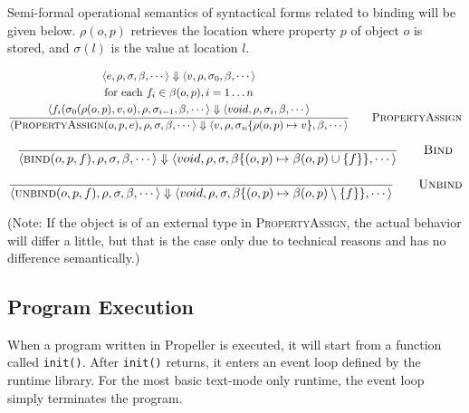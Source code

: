 Semi-formal operational semantics of syntactical forms related to binding will be given below.
$\rho(o, p)$ retrieves the location where property $p$ of object $o$ is stored, and $\sigma(l)$ is
the value at location $l$.

$$
\dfrac{\begin{gathered}
\langle e,\rho,\sigma,\beta,\cdots \rangle \Downarrow
\langle v,\rho,\sigma_0,\beta,\cdots \rangle\\
\textrm{for each } f_i\in\beta(o, p), i=1\dots n\\
\langle f_i(\sigma_0(\rho(o,p),v,o),\rho,\sigma_{i-1},\beta,\cdots \rangle \Downarrow
\langle void,\rho,\sigma_i,\beta,\cdots \rangle
\end{gathered}
}
{\langle \textsc{PropertyAssign}(o,p,e),\rho,\sigma,\beta,\cdots \rangle
\Downarrow
\langle v,\rho,\sigma_n\{\rho(o,p)\mapsto v\},\beta,\cdots \rangle
} \qquad \textsc{PropertyAssign}
$$

$$
\dfrac{}
{\langle \textsc{bind}(o,p,f),\rho,\sigma,\beta,\cdots \rangle
\Downarrow
\langle void,\rho,\sigma,\beta\{(o,p)\mapsto \beta(o,p)\cup \{f\}\},\cdots \rangle
} \qquad \textsc{Bind}
$$

$$
\dfrac{}
{\langle \textsc{unbind}(o,p,f),\rho,\sigma,\beta,\cdots \rangle
\Downarrow
\langle void,\rho,\sigma,\beta\{(o,p)\mapsto \beta(o,p)\setminus \{f\}\},\cdots \rangle
} \qquad \textsc{Unbind}
$$

(Note: If the object is of an external type in \textsc{PropertyAssign}, the actual behavior will
differ a little, but that is the case only due to technical reasons and has no difference
semantically.)

\subsection{Program Execution}

When a program written in Propeller is executed, it will start from a function called \verb|init()|.
After \verb|init()| returns, it enters an event loop defined by the runtime library. For the
most basic text-mode only runtime, the event loop simply terminates the program.

